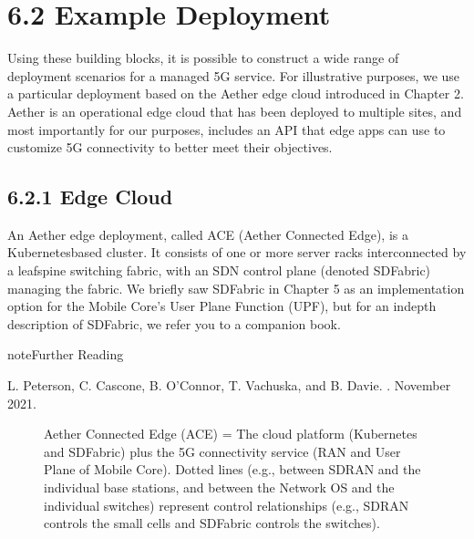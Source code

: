\documentclass[a4paper,11pt,english]{sphinxmanual}
\let\sphinxpxdimen\pdfpxdimen\else\newdimen\sphinxpxdimen
\begin{document}
\section{6.2 Example Deployment}
\label{\detokenize{cloud:example-deployment}}
\sphinxAtStartPar
Using these building blocks, it is possible to construct a wide range
of deployment scenarios for a managed 5G service. For illustrative
purposes, we use a particular deployment based on the Aether edge
cloud introduced in Chapter 2. Aether is an operational edge cloud
that has been deployed to multiple sites, and most importantly for our
purposes, includes an API that edge apps can use to customize 5G
connectivity to better meet their objectives.


\subsection{6.2.1 Edge Cloud}
\label{\detokenize{cloud:edge-cloud}}
\sphinxAtStartPar
An Aether edge deployment, called ACE (Aether Connected Edge), is a
Kubernetes\sphinxhyphen{}based cluster. It consists of one or more server racks
interconnected by a leaf\sphinxhyphen{}spine switching fabric, with an SDN control
plane (denoted SD\sphinxhyphen{}Fabric) managing the fabric. We briefly saw
SD\sphinxhyphen{}Fabric in Chapter 5 as an implementation option for the Mobile
Core’s User Plane Function (UPF), but for an in\sphinxhyphen{}depth description of
SD\sphinxhyphen{}Fabric, we refer you to a companion book.

\label{\detokenize{cloud:reading-sdn}}
\begin{sphinxadmonition}{note}{Further Reading}

\sphinxAtStartPar
L. Peterson, C. Cascone, B. O’Connor, T. Vachuska, and B. Davie.
.  November 2021.
\end{sphinxadmonition}

\begin{figure}[ht]
\centering
\capstart

\noindent\sphinxincludegraphics[width=350\sphinxpxdimen]{{Slide51}.png}
\caption{Aether Connected Edge (ACE) = The cloud platform (Kubernetes and
SD\sphinxhyphen{}Fabric) plus the 5G connectivity service (RAN and User Plane of
Mobile Core). Dotted lines (e.g., between SD\sphinxhyphen{}RAN and the individual
base stations, and between the Network OS and the individual
switches) represent control relationships (e.g., SD\sphinxhyphen{}RAN controls
the small cells and SD\sphinxhyphen{}Fabric controls the switches).}\label{\detokenize{cloud:id2}}\label{\detokenize{cloud:fig-ace}}\end{figure}
\end{document}
